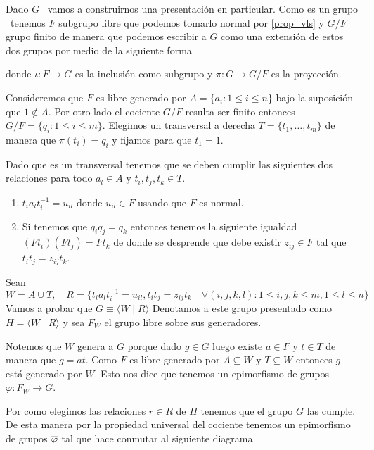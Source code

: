 \documentclass[tesis.tex]{subfiles}
\begin{document}
\begin{obs}\label{obs_presentacion_vl}
	Dado $G$ \vl \ vamos a construirnos una presentación en particular.
	Como es un grupo \vl \ tenemos $F$ subgrupo libre que podemos tomarlo normal por \ref{prop_vls} y $G/F$ grupo finito de manera que podemos escribir a $G$ como una extensión de estos dos grupos por medio de la siguiente forma
	\begin{center}
	\end{center}
	donde $\iota: F \to G$ es la inclusión como subgrupo y $\pi: G \to G/F$ es la proyección.

	
	Consideremos que $F$ es libre generado por $A = \{ a_i : 1 \le i \le n \}$ bajo la suposición que $1 \notin A$.
	Por otro lado el cociente $G/F$ resulta ser finito entonces $G/F = \{ q_i : 1 \le i \le m \}$.
	Elegimos un transversal a derecha $T = \{ t_1, \dots, t_m \}$ de manera que $\pi(t_i)= q_i$ y fijamos para que $t_1 = 1$.
	
	Dado que es un transversal tenemos que se deben cumplir las siguientes dos relaciones para todo $a_l \in A$ y $t_i,t_j,t_k \in T$. 
	\begin{enumerate}
		\item $t_ia_{l}t_i^{-1} = u_{il}$ donde $u_{il} \in F$ usando que $F$ es normal.
		\item Si tenemos que $q_iq_j = q_k$ entonces tenemos la siguiente igualdad 
		$(Ft_{i}) (Ft_{j}) = Ft_{k}$
		de donde se desprende que debe existir $z_{ij} \in F$ tal que 
		 $t_it_j = z_{ij}t_k$.
	\end{enumerate}
	Sean
	\[
		W = A \cup T, \quad R = \{t_ia_{l}t_i^{-1} = u_{il},  t_it_j = z_{ij}t_k \quad \forall (i,j,k,l) :   1 \le i,j,k \le m, 1 \le l  \le n \}
	\]
	Vamos a probar que $G \equiv \langle W \mid R \rangle$ 
	Denotamos a este grupo presentado como $H = \langle W \mid R \rangle$ y sea $F_{W}$ el grupo libre sobre sus generadores.
	
	Notemos que $W$ genera a $G$ porque
	dado $g \in G$ luego existe $a \in F$ y $t \in T$ de manera que $g = at$.
	Como $F$ es libre generado por $A \subseteq W$ y $T \subseteq W$ entonces $g$ está generado por $W$. 
	Esto nos dice que tenemos un epimorfismo de grupos $\varphi: F_{W} \to G$.
	
	Por como elegimos las relaciones $r \in R$ de $H$ tenemos que el grupo $G$ las cumple.
	De esta manera por la propiedad universal del cociente tenemos un epimorfismo de grupos $\overline \varphi$ tal que hace conmutar al siguiente diagrama	
	\begin{center}
	\end{center}
	

\end{obs}
\end{document}
